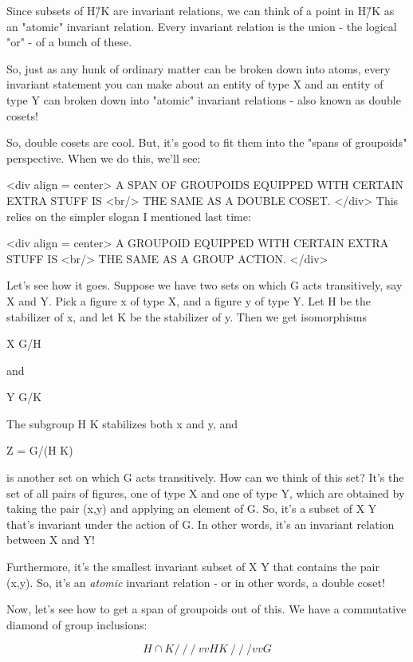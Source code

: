 Since subsets of H\G/K are invariant relations, we can think of a 
point in H\G/K as an "atomic" invariant relation.   Every invariant 
relation is the union - the logical "or" - of a bunch of these. 

So, just as any hunk of ordinary matter can be broken down into atoms,
every invariant statement you can make about an entity of type X and
an entity of type Y can broken down into "atomic" invariant
relations - also known as double cosets!

So, double cosets are cool.  But, it's good to fit them into the "spans
of groupoids" perspective.  When we do this, we'll see:

<div align = center>
          A SPAN OF GROUPOIDS EQUIPPED WITH CERTAIN EXTRA STUFF IS <br/>
                       THE SAME AS A DOUBLE COSET.
</div>
This relies on the simpler slogan I mentioned last time:

<div align = center>
             A GROUPOID EQUIPPED WITH CERTAIN EXTRA STUFF IS <br/>
                     THE SAME AS A GROUP ACTION.
</div>

Let's see how it goes.  Suppose we have two sets on which G acts
transitively, say X and Y.  Pick a figure x of type X, and a figure
y of type Y.  Let H be the stabilizer of x, and let K be the
stabilizer of y.  Then we get isomorphisms

X \cong  G/H 

and 

Y \cong  G/K

The subgroup H \cap  K stabilizes both x and y, and

Z = G/(H \cap  K)

is another set on which G acts transitively.  How can we think of this 
set?  It's the set of all pairs of figures, one of type X and one of 
type Y, which are obtained by taking the pair (x,y) and applying
an element of G.  So, it's a subset of X \times  Y that's invariant under
the action of G.  In other words, it's an invariant relation between
X and Y!  

Furthermore, it's the smallest invariant subset of X \times  Y that contains
the pair (x,y).  So, it's an \emph{atomic} invariant relation - or in other
words, a double coset!  
  
Now, let's see how to get a span of groupoids out of this.  We have
a commutative diamond of group inclusions:


$$

                      H\cap K
                      / \
                     /   \
                    /     \
                   v       v
                  H         K
                   \       /
                    \     /
                     \   /
                      v v
                       G
$$
    
